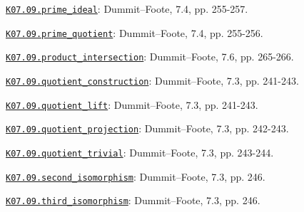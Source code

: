 \par\smallskip\noindent\hypertarget{src:K07.09.prime_ideal}{}\label{src:K07.09.prime_ideal}\hyperref[K07.09.prime_ideal]{\texttt{K07.09.prime\_ideal}}: Dummit--Foote, 7.4, pp. 255-257.
\par\smallskip\noindent\hypertarget{src:K07.09.prime_quotient}{}\label{src:K07.09.prime_quotient}\hyperref[K07.09.prime_quotient]{\texttt{K07.09.prime\_quotient}}: Dummit--Foote, 7.4, pp. 255-256.
\par\smallskip\noindent\hypertarget{src:K07.09.product_intersection}{}\label{src:K07.09.product_intersection}\hyperref[K07.09.product_intersection]{\texttt{K07.09.product\_intersection}}: Dummit--Foote, 7.6, pp. 265-266.
\par\smallskip\noindent\hypertarget{src:K07.09.quotient_construction}{}\label{src:K07.09.quotient_construction}\hyperref[K07.09.quotient_construction]{\texttt{K07.09.quotient\_construction}}: Dummit--Foote, 7.3, pp. 241-243.
\par\smallskip\noindent\hypertarget{src:K07.09.quotient_lift}{}\label{src:K07.09.quotient_lift}\hyperref[K07.09.quotient_lift]{\texttt{K07.09.quotient\_lift}}: Dummit--Foote, 7.3, pp. 241-243.
\par\smallskip\noindent\hypertarget{src:K07.09.quotient_projection}{}\label{src:K07.09.quotient_projection}\hyperref[K07.09.quotient_projection]{\texttt{K07.09.quotient\_projection}}: Dummit--Foote, 7.3, pp. 242-243.
\par\smallskip\noindent\hypertarget{src:K07.09.quotient_trivial}{}\label{src:K07.09.quotient_trivial}\hyperref[K07.09.quotient_trivial]{\texttt{K07.09.quotient\_trivial}}: Dummit--Foote, 7.3, pp. 243-244.
\par\smallskip\noindent\hypertarget{src:K07.09.second_isomorphism}{}\label{src:K07.09.second_isomorphism}\hyperref[K07.09.second_isomorphism]{\texttt{K07.09.second\_isomorphism}}: Dummit--Foote, 7.3, pp. 246.
\par\smallskip\noindent\hypertarget{src:K07.09.third_isomorphism}{}\label{src:K07.09.third_isomorphism}\hyperref[K07.09.third_isomorphism]{\texttt{K07.09.third\_isomorphism}}: Dummit--Foote, 7.3, pp. 246.
